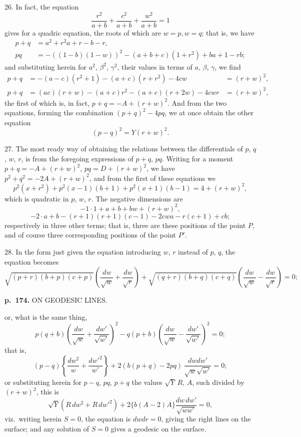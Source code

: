 \documentclass[11pt,a4paper]{book}
\begin{document}
26. In fact, the equation
\[
\frac{r^2}{a + b} + \frac{c^2}{a + b} + \frac{w^2}{a + b} = 1
\]
gives for a quadric equation, the roots of which are $w = p, w = q$; that is, we have
\begin{align*}
p + q &= a^2 + r^2 a + r - b - r, \\
p q &= -((1 - b)(1 - w))^2 - (a + b + c)(1 + r^2) + b a + 1 - rb;
\end{align*}
and substituting herein for $a^2$, $\beta^2$, $\gamma^2$, their values in terms of $a$, $\beta$, $\gamma$, we find
\begin{align*}
p + q &= -(a - c)(r^2 + 1) - (a + c)(r + r^2) - 4cw  &= (r + w)^2, \\
p + q &= (a c)(r + w) - (a + c)r^2 - (a + c)(r + 2w) - 4cwr  &= (r + w)^2,
\end{align*}
the first of which is, in fact, $p + q = -A + (r + w)^2$.  And from the two equations, forming the combination $(p + q)^2 - 4pq$, we at once obtain the other equation
\[
(p - q)^2 = Y(r + w)^2.
\]

27. The most ready way of obtaining the relations between the differentials of $p$, $q$, $w$, $r$, is from the foregoing expressions of $p + q$, $pq$.  Writing for a moment $p + q = -A + (r + w)^2$, $pq = D + (r + w)^2$, we have $p^2 + q^2 = -2A + (r + w)^2$, and from the first of these equations we
\[
p^2 (x + r^2) + p^2 (x - 1)(b + 1) + p^2 (x + 1)(b - 1) = 4 + (r + w)^2,
\]
which is quadratic in $p$, $w$, $r$.  The negative dimensions are
\[
-1 \cdot 1 + a + b + bw + (r + w)^2,
\]
\[
-2 \cdot a + b - (r + 1)(r + 1)(c - 1) - 2cwa - r(c + 1) + cb;
\]
respectively in three other terms; that is, three are these positions of the point $P$, and of course three corresponding positions of the point $P'$.

28. In the form just given the equation introducing $w$, $r$ instead of $p$, $q$, the equation becomes
\[
\sqrt{(p+r)(b+p)(c+p)}\left(\frac{dw}{\sqrt{w}}+\frac{dw}{\sqrt{r}}\right)+\sqrt{(q+r)(b+q)(c+q)}\left(\frac{dw}{\sqrt{w}}-\frac{dw}{\sqrt{r}}\right)=0;
\]

\clearpage

\noindent
\textbf{p.~174.}  ON GEODESIC LINES.

or, what is the same thing,
\[
p(q + b)\left(\frac{dw}{\sqrt{w}} + \frac{dw'}{\sqrt{w'}}\right)^2 - q(p + b)\left(\frac{dw}{\sqrt{w}} - \frac{dw'}{\sqrt{w'}}\right)^2 = 0;
\]
that is,
\[
(p - q)\left\{\frac{dw^2}{w} + \frac{dw'^2}{w'}\right\} + 2 (b(p + q) - 2pq)\, \frac{dw dw'}{\sqrt{w}\sqrt{w'}} = 0;
\]
or substituting herein for $p - q$, $pq$, $p + q$ the values $\sqrt{Y}\, R$, $A$, such divided by $(r + w)^2$, this is
\[
\sqrt{Y}(R\, dw^2 + R\, dw'^2) + 2 \{b(A - 2)A\} \frac{dw\, dw'}{\sqrt{ww'}} = 0,
\]
viz.\ writing herein $S = 0$, the equation is $dw dr = 0$, giving the right lines on the surface; and any solution of $S = 0$ gives a geodesic on the surface.
\end{document}
